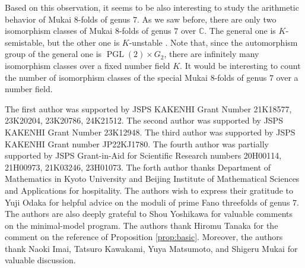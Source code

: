 \documentclass[autodetect-engine, a4paper]{amsart}
\theoremstyle{definition}
\def\C{{\mathbb C}}
\DeclareMathOperator{\PGL}{PGL}
\begin{document}
Based on this observation, it seems to be also interesting to study the arithmetic behavior of Mukai $8$-folds of genus $7$.
As we saw before, there are only two isomorphism classes of Mukai $8$-folds of genus $7$ over $\C$.
The general one is $K$-semistable, but the other one is $K$-unstable \cite{Del23} \cite{Kan22}.
Note that, since the automorphism group of the general one is $\PGL(2) \times G_2$, there are infinitely many isomorphism classes over a fixed number field $K$.
It would be interesting to count the number of isomorphism classes of the special Mukai $8$-folds of genus $7$ over a number field.

\medskip
{}
The first author was supported by JSPS KAKENHI Grant Number 21K18577, 23K20204, 23K20786, 24K21512.
The second author was supported by JSPS KAKENHI Grant Number 23K12948.
The third author was supported by JSPS KAKENHI Grant number JP22KJ1780.
The fourth author was partially supported
by JSPS Grant-in-Aid for Scientific Research numbers 20H00114, 21H00973, 21K03246, 23H01073. 
The forth author thanks Department of Mathematics in Kyoto University and Beijing Institute of Mathematical Sciences and Applications for hospitality. The authors wish to express their gratitude to Yuji Odaka for helpful advice on the moduli of prime Fano threefolds of genus $7$.
The authors are also deeply grateful to Shou Yoshikawa for valuable comments on the minimal-model program.
The authors thank Hiromu Tanaka for the comment on the reference of Proposition \ref{prop:basic}. 
Moreover, the authors thank Naoki Imai, Tatsuro Kawakami, Yuya Matsumoto, and Shigeru Mukai for valuable discussion.


% 
% 
\printbibliography
\end{document}
